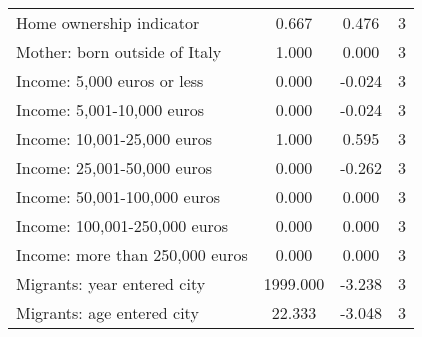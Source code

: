 \begin{table}[htbp]
\begin{tabular}{l*{1}{ccc}}
Home ownership indicator&       0.667         &       0.476&           3\\
Mother: born outside of Italy&       1.000         &       0.000&           3\\
Income: 5,000 euros or less&       0.000         &      -0.024&           3\\
Income: 5,001-10,000 euros&       0.000         &      -0.024&           3\\
Income: 10,001-25,000 euros&       1.000\sym{*}  &       0.595&           3\\
Income: 25,001-50,000 euros&       0.000         &      -0.262&           3\\
Income: 50,001-100,000 euros&       0.000         &       0.000&           3\\
Income: 100,001-250,000 euros&       0.000         &       0.000&           3\\
Income: more than 250,000 euros&       0.000         &       0.000&           3\\
Migrants: year entered city&    1999.000\sym{*}  &      -3.238&           3\\
Migrants: age entered city&      22.333         &      -3.048&           3\\
\bottomrule
\end{tabular}
\end{table}
